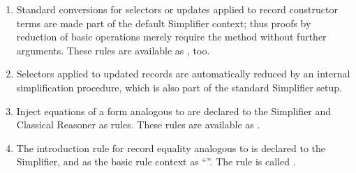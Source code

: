 \begin{isabellebody}
\begin{isamarkuptext}
\begin{enumerate}
  \item Standard conversions for selectors or updates applied to
  record constructor terms are made part of the default Simplifier
  context; thus proofs by reduction of basic operations merely require
  the \hyperlink{method.simp}{\mbox{}} method without further arguments.  These rules
  are available as , too.

  \item Selectors applied to updated records are automatically reduced
  by an internal simplification procedure, which is also part of the
  standard Simplifier setup.

  \item Inject equations of a form analogous to  are declared to the Simplifier and Classical
  Reasoner as \hyperlink{attribute.iff}{\mbox{}} rules.  These rules are available as
  .

  \item The introduction rule for record equality analogous to  is declared to the Simplifier,
  and as the basic rule context as ``\hyperlink{attribute.intro}{\mbox{}}''.
  The rule is called .


\end{enumerate}
\end{isamarkuptext}
\end{isabellebody}
